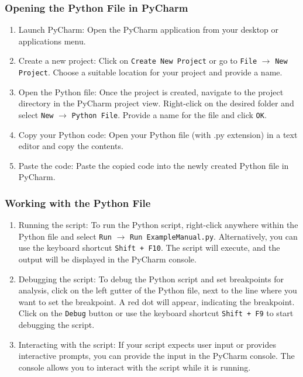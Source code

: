 \subsubsection{Opening the Python File in PyCharm}
\begin{enumerate}
	\item Launch PyCharm: Open the PyCharm application from your desktop or applications menu.
	\item Create a new project: Click on \texttt{Create New Project} or go to \texttt{File} $\rightarrow$ \texttt{New Project}. Choose a suitable location for your project and provide a name.
	\item Open the Python file: Once the project is created, navigate to the project directory in the PyCharm project view. Right-click on the desired folder and select \texttt{New} $\rightarrow$ \texttt{Python File}. Provide a name for the file and click \texttt{OK}.
	\item Copy your Python code: Open your Python file (with .py extension) in a text editor and copy the contents.
	\item Paste the code: Paste the copied code into the newly created Python file in PyCharm.
\end{enumerate}

\subsubsection{Working with the Python File}
\begin{enumerate}
	\item Running the script: To run the Python script, right-click anywhere within the Python file and select \texttt{Run} $\rightarrow$ \texttt{Run ExampleManual.py}. Alternatively, you can use the keyboard shortcut \texttt{Shift + F10}. The script will execute, and the output will be displayed in the PyCharm console.
	\item Debugging the script: To debug the Python script and set breakpoints for analysis, click on the left gutter of the Python file, next to the line where you want to set the breakpoint. A red dot will appear, indicating the breakpoint. Click on the \texttt{Debug} button or use the keyboard shortcut \texttt{Shift + F9} to start debugging the script.
	\item Interacting with the script: If your script expects user input or provides interactive prompts, you can provide the input in the PyCharm console. The console allows you to interact with the script while it is running.
\end{enumerate}

